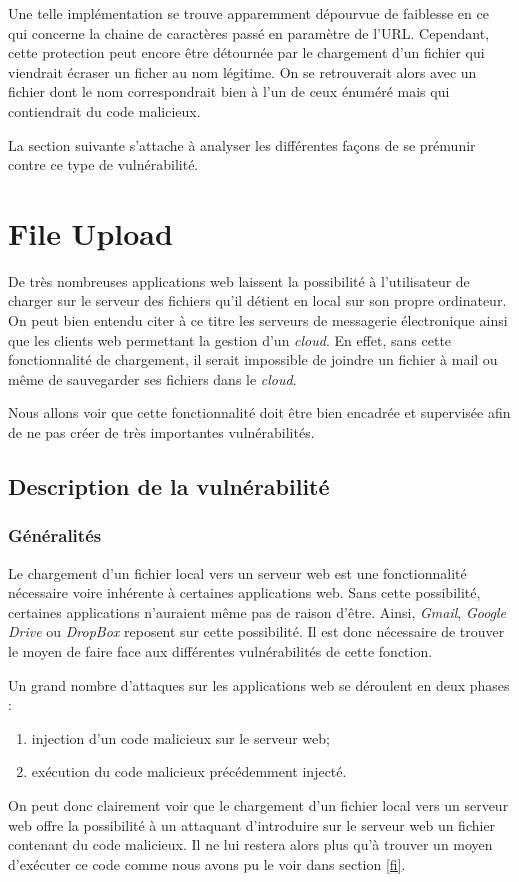 Une telle implémentation se trouve apparemment dépourvue de faiblesse en ce qui concerne la chaine de caractères passé en paramètre de l'URL. Cependant, cette protection peut encore être détournée par le chargement d'un fichier qui viendrait écraser un ficher au nom légitime. On se retrouverait alors avec un fichier dont le nom correspondrait bien à l'un de ceux énuméré mais qui contiendrait du code malicieux. 

La section suivante s'attache à analyser les différentes façons de se prémunir contre ce type de vulnérabilité.


\section{File Upload}
\label{fu}

De très nombreuses applications web laissent la possibilité à l'utilisateur de charger sur le serveur des fichiers qu'il détient en local sur son propre ordinateur. On peut bien entendu citer à ce titre les serveurs de messagerie électronique ainsi que les clients web permettant la gestion d'un \textit{cloud}. En effet, sans cette fonctionnalité de chargement, il serait impossible de joindre un fichier à mail ou même de sauvegarder ses fichiers dans le \textit{cloud}. 

Nous allons voir que cette fonctionnalité doit être bien encadrée et supervisée afin de ne pas créer de très importantes vulnérabilités.

\subsection{Description de la vulnérabilité}

\subsubsection{Généralités}

Le chargement d'un fichier local vers un serveur web est une fonctionnalité nécessaire voire inhérente à certaines applications web. Sans cette possibilité, certaines applications n'auraient même pas de raison d'être. Ainsi, \textit{Gmail}, \textit{Google Drive} ou \textit{DropBox} reposent sur cette possibilité. Il est donc nécessaire de trouver le moyen de faire face aux différentes vulnérabilités de cette fonction.

Un grand nombre d'attaques sur les applications web se déroulent en deux phases :
\begin{enumerate}
\item injection d'un code malicieux sur le serveur web;
\item exécution du code malicieux précédemment injecté.
\end{enumerate} 
On peut donc clairement voir que le chargement d'un fichier local vers un serveur web offre la possibilité à un attaquant d'introduire sur le serveur web un fichier contenant du code malicieux. Il ne lui restera alors plus qu'à trouver un moyen d'exécuter ce code comme nous avons pu le voir dans section \ref{fi}.

